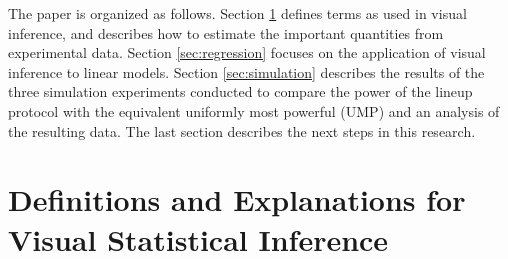 \documentclass{article}
\newcommand{\blue}[1]{{\color{blue} #1}} %
\begin{document}





The paper is organized as follows. Section \ref{sec:visual_test} defines terms as used in visual inference, and describes how to estimate the important quantities from experimental data. Section \ref{sec:regression} focuses on the application of  visual inference to linear models.  Section \ref{sec:simulation} describes the results of the three simulation experiments conducted to compare the power of the lineup protocol with the equivalent uniformly most powerful (UMP) and an analysis of the resulting data. The last section describes the next steps in this research.


\section{Definitions and Explanations for Visual Statistical Inference} \label{sec:visual_test} 
\end{document}
